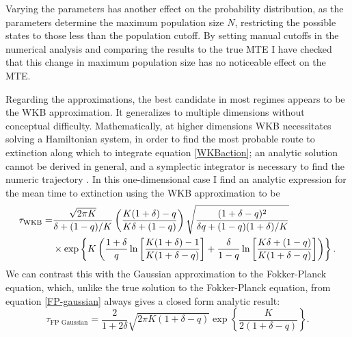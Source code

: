 Varying the parameters has another effect on the probability distribution, as the parameters determine the maximum population size $N$, restricting the possible states to those less than the population cutoff. 
By setting manual cutoffs in the numerical analysis and comparing the results to the true MTE I have checked that this change in maximum population size has no noticeable effect on the MTE. 

Regarding the approximations, the best candidate in most regimes appears to be the WKB approximation. 
It generalizes to multiple dimensions without conceptual difficulty.
Mathematically, at higher dimensions WKB necessitates solving a Hamiltonian system, in order to find the most probable route to extinction along which to integrate equation \ref{WKBaction}; an analytic solution cannot be derived in general, and a symplectic integrator is necessary to find the numeric trajectory \cite{Channell1990}. 
In this one-dimensional case I find an analytic expression for the mean time to extinction using the WKB approximation to be
\begin{align}
\tau_{\text{WKB}} = &\frac{\sqrt{2 \pi K}}{\delta+(1-q)/K} \left(\frac{K(1+\delta)-q}{K\delta + (1-q)}\right) \sqrt{\frac{(1+\delta-q)^2}{\delta q + (1-q)(1+\delta)/K}} \\
                    &\times \exp \left\{ K\left( \frac{1+\delta}{q}\ln\left[\frac{K(1+\delta)-1}{K(1+\delta-q)}\right] + \frac{\delta}{1-q}\ln\left[\frac{K\delta+(1-q)}{K(1+\delta-q)}\right] \right) \right\}. \notag
\end{align}
We can contrast this with the Gaussian approximation to the Fokker-Planck equation, which, unlike the true solution to the Fokker-Planck equation, from equation \ref{FP-gaussian} always gives a closed form analytic result:
\begin{equation}
\tau_{\text{FP Gaussian}} = \frac{2}{1+2\delta} \sqrt{2 \pi K (1+\delta-q)} \exp\left\{\frac{K}{2(1+\delta-q)} \right\}.
\end{equation}
